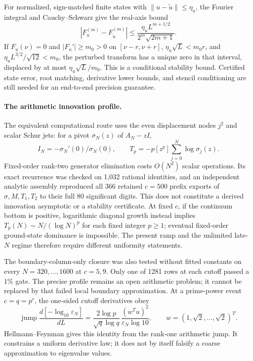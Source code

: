 For normalized, sign-matched finite states with $\|u-\widetilde u\|\le\eta_u$,
the Fourier integral and Cauchy--Schwarz give the real-axis bound
\[
 |F_u^{(m)}-F_{\widetilde u}^{(m)}|
 \le \frac{\eta_u L^{m+1/2}}{2^m\sqrt{2m+1}}.
\]
If $F_u(\nu)=0$ and $|F_u'|\ge m_0>0$ on $[\nu-r,\nu+r]$,
$\eta_u\sqrt L<m_0r$, and $\eta_u L^{3/2}/\sqrt{12}<m_0$, the perturbed
transform has a unique zero in that interval, displaced by at most
$\eta_u\sqrt L/m_0$. This is a conditional stability bound. Certified state
error, root matching, derivative lower bounds, and stencil conditioning are
still needed for an end-to-end precision guarantee.

\paragraph{The arithmetic innovation profile.}
The equivalent computational route uses the even displacement nodes $j^2$ and
scalar Schur jets: for a pivot $\sigma_N(z)$ of $A_N-zI$,
\[
 I_N=-\sigma_N'(0)/\sigma_N(0),\qquad
 T_p=-p[z^p]\sum_{j=0}^N\log\sigma_j(z).
\]
Fixed-order rank-two generator elimination costs $O(N^2)$ scalar operations.
Its exact recurrence was checked on 1,032 rational identities, and an independent
analytic assembly reproduced all 366 retained $c=500$ prefix exports of
$\sigma,M,T_1,T_2$ to their full 80 significant digits. This does not constitute
a derived innovation asymptotic or a stability certificate. At fixed $c$, if
the continuum bottom is positive, logarithmic diagonal growth instead implies
$T_p(N)\sim N/(\log N)^p$ for each fixed integer $p\ge1$; eventual fixed-order ground-state
dominance is impossible. The present ramp and the unlimited late-$N$ regime
therefore require different uniformity statements.

The boundary-column-only closure was also tested without fitted constants on
every $N=320,\ldots,1600$ at $c=5,9$. Only one of 1281 rows at each cutoff
passed a $1\%$ gate. The precise profile remains an open arithmetic problem;
it cannot be replaced by that failed local boundary approximation.
At a prime-power event $c=q=p^r$, the one-sided cutoff derivatives obey
\[
 \operatorname{jump}\frac{d[-\log_{10}\varepsilon_N]}{dL}
 =\frac{2\log p}{\sqrt q\log q}\,
   \frac{(w^Tu)^2}{\varepsilon_N\log 10},
 \qquad w=(1,\sqrt2,\ldots,\sqrt2)^T.
\]
Hellmann--Feynman gives this identity from the rank-one arithmetic jump.
It constrains a uniform derivative law;
it does not by itself falsify a coarse approximation to eigenvalue values.
